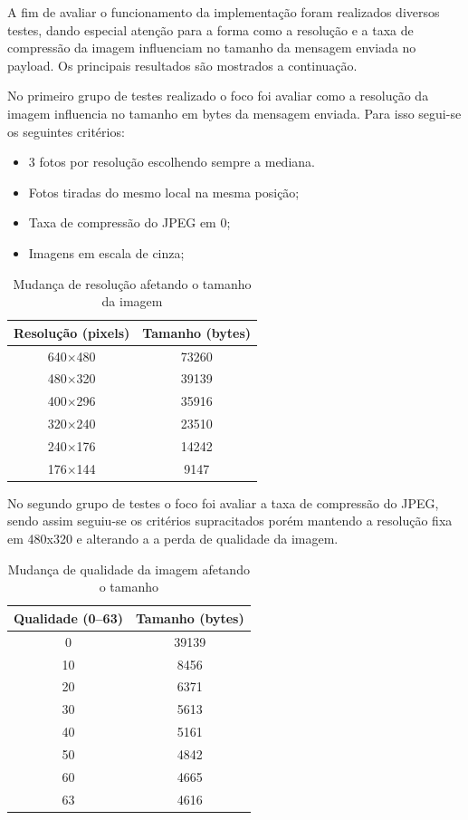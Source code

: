 \documentclass[
article,			%
12pt,				%
oneside,			%
a4paper,			%
english,			%
brazil,				%
sumario=tradicional
]{abntex2}
\begin{document}
A fim de avaliar o funcionamento da implementação foram realizados diversos testes, dando especial atenção para a forma como a resolução e a taxa de compressão da imagem influenciam no tamanho da mensagem enviada no payload. Os principais resultados são mostrados a continuação.

No primeiro grupo de testes realizado o foco foi avaliar como a resolução da imagem influencia no tamanho em bytes da mensagem enviada. Para isso segui-se os seguintes critérios:
\begin{itemize}
    \setlength\itemsep{0.01cm}
    \item 3 fotos por resolução escolhendo sempre a mediana.
    \item Fotos tiradas do mesmo local na mesma posição;
    \item Taxa de compressão do JPEG em 0;
    \item Imagens em escala de cinza;
\end{itemize}

\begin{table}[!h]
\centering
\begin{tabular}{@{}c|c@{}}
\toprule
Resolução (pixels) & Tamanho (bytes) \\ \midrule
640$\times$480            & 73260           \\
480$\times$320            & 39139           \\
400$\times$296            & 35916           \\
320$\times$240            & 23510           \\
240$\times$176            & 14242           \\
176$\times$144            & 9147            \\ \bottomrule
\end{tabular}
\caption{Mudança de resolução afetando o tamanho da imagem}
\label{tab:resolution}
\end{table}

No segundo grupo de testes o foco foi avaliar a taxa de compressão do JPEG, sendo assim seguiu-se os critérios supracitados porém mantendo a resolução fixa em 480x320 e alterando a a perda de qualidade da imagem.

\begin{table}[!h]
\centering
\begin{tabular}{@{}c|c@{}}
\toprule
Qualidade (0--63) & Tamanho (bytes) \\ \midrule
0                & 39139           \\
10               & 8456            \\
20               & 6371            \\
30               & 5613            \\
40               & 5161            \\
50               & 4842            \\
60               & 4665            \\
63               & 4616            \\ \bottomrule
\end{tabular}
\caption{Mudança de qualidade da imagem afetando o tamanho}
\label{tab:quality}
\end{table}
\end{document}
